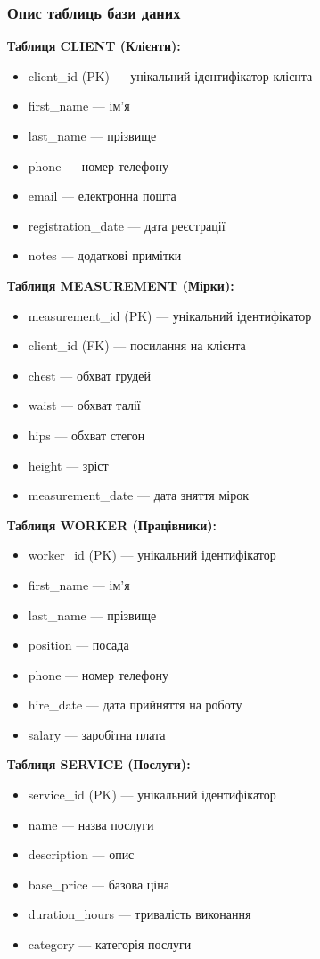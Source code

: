 \documentclass[14pt,a4paper]{extarticle}
\begin{document}
\subsubsection{Опис таблиць бази даних}

\textbf{Таблиця CLIENT (Клієнти):}
\begin{itemize}
    \item client\_id (PK) --- унікальний ідентифікатор клієнта
    \item first\_name --- ім'я
    \item last\_name --- прізвище
    \item phone --- номер телефону
    \item email --- електронна пошта
    \item registration\_date --- дата реєстрації
    \item notes --- додаткові примітки
\end{itemize}

\textbf{Таблиця MEASUREMENT (Мірки):}
\begin{itemize}
    \item measurement\_id (PK) --- унікальний ідентифікатор
    \item client\_id (FK) --- посилання на клієнта
    \item chest --- обхват грудей
    \item waist --- обхват талії
    \item hips --- обхват стегон
    \item height --- зріст
    \item measurement\_date --- дата зняття мірок
\end{itemize}

\textbf{Таблиця WORKER (Працівники):}
\begin{itemize}
    \item worker\_id (PK) --- унікальний ідентифікатор
    \item first\_name --- ім'я
    \item last\_name --- прізвище
    \item position --- посада
    \item phone --- номер телефону
    \item hire\_date --- дата прийняття на роботу
    \item salary --- заробітна плата
\end{itemize}

\textbf{Таблиця SERVICE (Послуги):}
\begin{itemize}
    \item service\_id (PK) --- унікальний ідентифікатор
    \item name --- назва послуги
    \item description --- опис
    \item base\_price --- базова ціна
    \item duration\_hours --- тривалість виконання
    \item category --- категорія послуги
\end{itemize}
\end{document}
